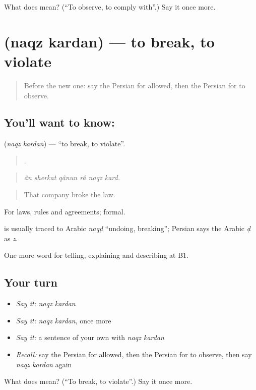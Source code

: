 \begin{tcolorbox}[breakable,colback=teal!4,colframe=teal!35!black,title={Before you move on}]
What does   mean? (\textquotedblleft{}To observe, to comply with\textquotedblright{}.) Say it once more.
\end{tcolorbox}
\section[\texorpdfstring{\fa{نقض} \fa{کردن} (naqz kardan)}{نقض کردن (naqz kardan)}]{  (naqz kardan) — to break, to violate}

\label{lesson:FA-C404-naqz-kardan}



\begin{quote}
Before the new one: say the Persian for allowed, then the Persian for to observe.
\end{quote}

\subsection*{You'll want to know:  }
\textbf{ } (\emph{naqz kardan}) — \textquotedblleft{}to break, to violate\textquotedblright{}.

\begin{quote}
     .
\end{quote}

\begin{quote}
\emph{ân sherkat qânun râ naqz kard.}
\end{quote}

\begin{quote}
That company broke the law.
\end{quote}

For laws, rules and agreements; formal.

\begin{cousinweb}
\textbf{} is usually traced to Arabic \emph{naqḍ} \textquotedblleft{}undoing, breaking\textquotedblright{}; Persian says the Arabic \emph{ḍ} as \emph{z}.
\end{cousinweb}

\begin{grammarlens}[title={What you've built}]
One more word for telling, explaining and describing at B1.
\end{grammarlens}

\subsection*{Your turn}
\begin{itemize}
\raggedright
  \item \emph{Say it:} \emph{naqz kardan}
  \item \emph{Say it:} \emph{naqz kardan}, once more
  \item \emph{Say it:} a sentence of your own with \emph{naqz kardan}
  \item \emph{Recall:} say the Persian for allowed, then the Persian for to observe, then say \emph{naqz kardan} again
\end{itemize}

\begin{tcolorbox}[breakable,colback=teal!4,colframe=teal!35!black,title={Before you move on}]
What does   mean? (\textquotedblleft{}To break, to violate\textquotedblright{}.) Say it once more.
\end{tcolorbox}
